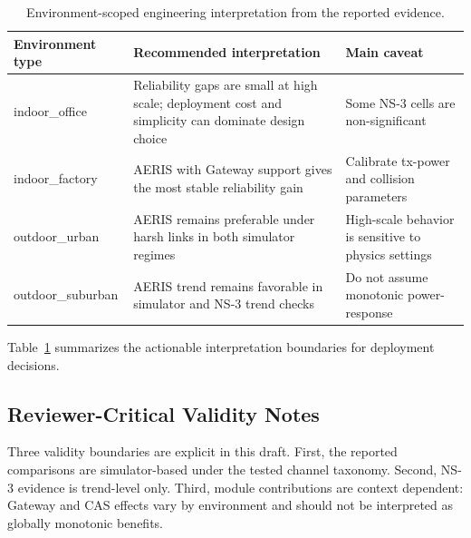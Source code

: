 ﻿\documentclass[sensors,article,submit,moreauthors,pdftex]{Definitions/mdpi}
\begin{document}
\begin{table}[H]
\caption{Environment-scoped engineering interpretation from the reported evidence.}
\label{tab:deployment_summary}
\centering
\small
\begin{tabular}{>{\raggedright\arraybackslash}p{} >{\raggedright\arraybackslash}p{} >{\raggedright\arraybackslash}p{}}
\toprule
Environment type & Recommended interpretation & Main caveat \\
\midrule
indoor\_office & Reliability gaps are small at high scale; deployment cost and simplicity can dominate design choice & Some NS-3 cells are non-significant \\
indoor\_factory & AERIS with Gateway support gives the most stable reliability gain & Calibrate tx-power and collision parameters \\
outdoor\_urban & AERIS remains preferable under harsh links in both simulator regimes & High-scale behavior is sensitive to physics settings \\
outdoor\_suburban & AERIS trend remains favorable in simulator and NS-3 trend checks & Do not assume monotonic power-response \\
\bottomrule
\end{tabular}
\normalsize
\end{table}

Table~\ref{tab:deployment_summary} summarizes the actionable interpretation boundaries for deployment decisions.

\subsection*{Reviewer-Critical Validity Notes}
Three validity boundaries are explicit in this draft. First, the reported comparisons are simulator-based under the tested channel taxonomy. Second, NS-3 evidence is trend-level only. Third, module contributions are context dependent: Gateway and CAS effects vary by environment and should not be interpreted as globally monotonic benefits.
\end{document}
